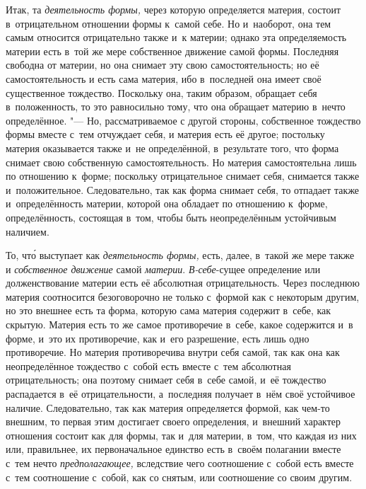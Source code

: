 Итак, та {\em деятельность формы,} через которую определяется материя, состоит
в~отрицательном отношении формы к~самой себе. Но и~наоборот, она тем самым
относится отрицательно также и~к материи; однако эта определяемость материи
есть в~той же мере собственное движение самой формы. Последняя свободна от
материи, но она снимает эту свою самостоятельность; но её самостоятельность и
есть сама материя, ибо в~последней она имеет своё существенное тождество.
Поскольку она, таким образом, обращает себя в~положенность, то это равносильно
тому, что она обращает материю в~нечто определённое. "--- Но, рассматриваемое с
другой стороны, собственное тождество формы вместе с~тем отчуждает себя, и
материя есть её другое; постольку материя оказывается также и~не определённой,
в~результате того, что форма снимает свою собственную самостоятельность. Но
материя самостоятельна лишь по отношению к~форме; поскольку отрицательное
снимает себя, снимается также и~положительное. Следовательно, так как форма
снимает себя, то отпадает также и~определённость материи, которой она обладает
по отношению к~форме, определённость, состоящая в~том, чтобы быть
неопределённым устойчивым наличием.

То, чт\'{о} выступает как {\em деятельность формы,} есть, далее, в~такой же
мере также и {\em собственное движение} самой {\em материи}. {\em В-себе}-сущее
определение или долженствование материи есть её абсолютная отрицательность.
Через последнюю материя соотносится безоговорочно не только с~формой как с
некоторым другим, но это внешнее есть та форма, которую сама материя содержит
в~себе, как скрытую. Материя есть то же самое противоречие в~себе, какое
содержится и~в форме, и~это их противоречие, как и~его разрешение, есть лишь
одно противоречие. Но материя противоречива внутри себя самой, так как она как
неопределённое тождество с~собой есть вместе с~тем абсолютная отрицательность;
она поэтому снимает себя в~себе самой, и~её тождество распадается в~её
отрицательности, а~последняя получает в~нём своё устойчивое наличие.
Следовательно, так как материя определяется формой, как чем-то внешним, то
первая этим достигает своего определения, и~внешний характер отношения состоит
как для формы, так и~для материи, в~том, что каждая из них или, правильнее, их
первоначальное единство есть в~своём полагании вместе с~тем нечто
{\em предполагающее,} вследствие чего соотношение с~собой есть вместе с~тем
соотношение с~собой, как со снятым, или соотношение со своим другим.

